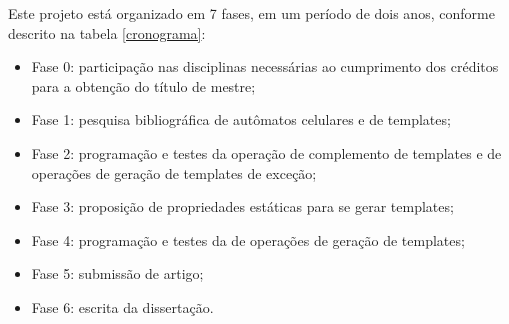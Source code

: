 \documentclass[12pt,a4paper]{article}
\begin{document}
Este projeto está organizado em 7 fases, em um período de dois anos, conforme descrito na tabela \ref{cronograma}:

  \begin{itemize}
      \item Fase 0: participação nas disciplinas necessárias ao cumprimento dos créditos para a obtenção do título de mestre;
      \item Fase 1: pesquisa bibliográfica de autômatos celulares e de templates;
      \item Fase 2: programação e testes da operação de complemento de templates e de operações de geração de templates de exceção;
      \item Fase 3: proposição de propriedades estáticas para se gerar templates;
      \item Fase 4: programação e testes da de operações de geração de templates;
      \item Fase 5: submissão de artigo;
      \item Fase 6: escrita da dissertação.
  \end{itemize}

\begin{table}[h!]
\centering
\caption{Cronograma de desenvolvimento do projeto}
\label{cronograma}
\end{table}
\end{document}

